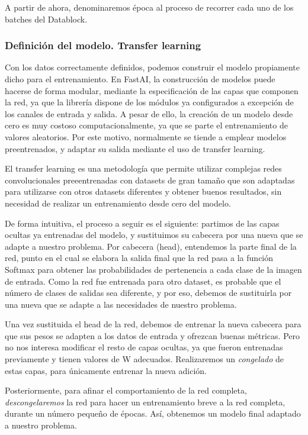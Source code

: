 A partir de ahora, denominaremos época al proceso de recorrer cada uno de los batches del Datablock.

\subsubsection{Definición del modelo. Transfer learning}

Con los datos correctamente definidos, podemos construir el modelo propiamente dicho para el entrenamiento. En FastAI, la construcción de modelos puede hacerse de forma modular, mediante la especificación de las capas que componen la red, ya que la librería dispone de los módulos ya configurados a excepción de los canales de entrada y salida. A pesar de ello, la creación de un modelo desde cero es muy costoso computacionalmente, ya que se parte el entrenamiento de valores aleatorios. Por este motivo, normalmente se tiende a emplear modelos preentrenados, y adaptar su salida mediante el uso de transfer learning.

El transfer learning es una metodología que permite utilizar complejas redes convolucionales preeentrenadas con datasets de gran tamaño que son adaptadas para utilizarse con otros datasets diferentes y obtener buenos resultados, sin necesidad de realizar un entrenamiento desde cero del modelo.\

De forma intuitiva, el proceso a seguir es el siguiente: partimos de las capas ocultas ya entrenadas del modelo, y sustituimos su cabecera por una nueva que se adapte a nuestro problema. Por cabecera (head), entendemos la parte final de la red, punto en el cual se elabora la salida final que la red pasa a la función Softmax para obtener las probabilidades de pertenencia a cada clase de la imagen de entrada. Como la red fue entrenada para otro dataset, es probable que el número de clases de salidas sea diferente, y por eso, debemos de sustituirla por una nueva que se adapte a las necesidades de nuestro problema.

Una vez sustituida el head de la red, debemos de entrenar la nueva cabecera para que sus pesos se adapten a los datos de entrada y ofrezcan buenas métricas. Pero no nos interesa modificar el resto de capas ocultas, ya que fueron entrenadas previamente y tienen valores de W adecuados. Realizaremos un \textit{congelado} de estas capas, para únicamente entrenar la nueva adición.

Posteriormente, para afinar el comportamiento de la red completa, \textit{descongelaremos} la red para hacer un entrenamiento breve a la red completa, durante un número pequeño de épocas. Así, obtenemos un modelo final adaptado a nuestro problema.

